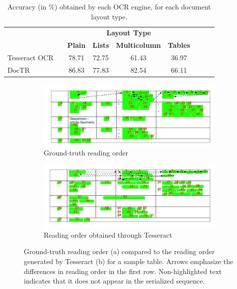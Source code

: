 \begin{table}[ht]
  \centering
  \small
  \begin{adjustbox}{max width=\textwidth}
  \begin{threeparttable}
  \begin{tabular}{lcccccccc}
      \toprule
          & & \multicolumn{4}{c}{\textbf{Layout Type}} & \\
          & & \textbf{Plain} & \textbf{Lists} & \textbf{Multicolumn} & \textbf{Tables}\\
      \midrule
      Tesseract OCR \citep{kay2007tesseract} & & 78.71 & 72.75 & 61.43 & 36.97 \\
      DocTR \citep{doctr2021} & & 86.83 & 77.83 & 82.54 & 66.11 \\
  \bottomrule
  \end{tabular}
  \end{threeparttable}
  \end{adjustbox}
  \caption{Accuracy (in \%) obtained by each \ac{OCR} engine, for each document layout type.}
  \label{table:ocr-preliminary-experiments}
\end{table}

\begin{figure}[ht]
    \centering
    \small
      \begin{subfigure}[b]{\textwidth}
        \includegraphics[width=\textwidth]{images/chapter4/gold_tables_with_ro.pdf}
        \caption{Ground-truth reading order}
      \end{subfigure}
      \begin{subfigure}[b]{\textwidth}
        \includegraphics[width=\textwidth]{images/chapter4/tesseract_tables_with_ro.pdf}
        \caption{Reading order obtained through Tesseract}
      \end{subfigure}
    \caption{Ground-truth reading order (a) compared to the reading order generated by Tesseract (b) for a sample table. Arrows emphasize the differences in reading order in the first row. Non-highlighted text indicates that it does not appear in the serialized sequence.}
    \label{fig:reading-orders-table}
\end{figure}

